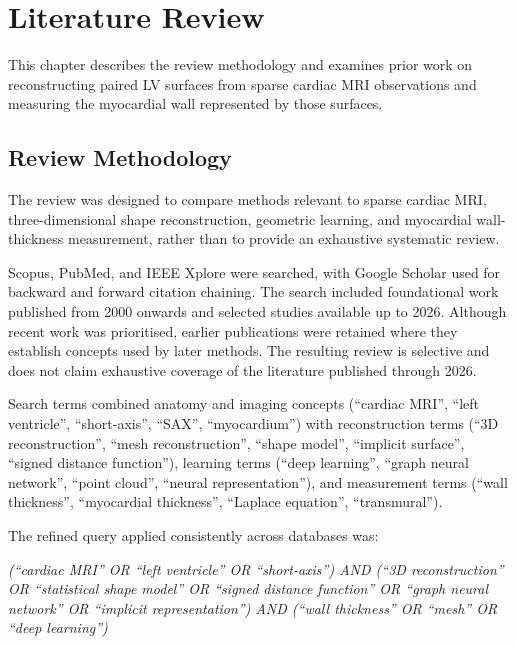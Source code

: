 ﻿%
\chapter{Literature Review}
\label{ch:literature-review}

\noindent
This chapter describes the review methodology and examines prior work on
reconstructing paired LV surfaces from sparse cardiac MRI observations and
measuring the myocardial wall represented by those surfaces.

\section{Review Methodology}
\label{sec:review-methodology}

\noindent
The review was designed to compare methods relevant to sparse cardiac MRI,
three-dimensional shape reconstruction, geometric learning, and myocardial
wall-thickness measurement, rather than to provide an exhaustive systematic
review.

Scopus, PubMed, and IEEE Xplore were searched, with Google Scholar used for
backward and forward citation chaining. The search included foundational work
published from 2000 onwards and selected studies available up to 2026. Although
recent work was prioritised, earlier publications were retained where they
establish concepts used by later methods. The resulting review is selective and
does not claim exhaustive coverage of the literature published through 2026.

Search terms combined anatomy and imaging concepts (``cardiac MRI'', ``left
ventricle'', ``short-axis'', ``SAX'', ``myocardium'') with reconstruction
terms (``3D reconstruction'', ``mesh reconstruction'', ``shape model'',
``implicit surface'', ``signed distance function''), learning terms (``deep
learning'', ``graph neural network'', ``point cloud'', ``neural
representation''), and measurement terms (``wall thickness'', ``myocardial
thickness'', ``Laplace equation'', ``transmural'').

The refined query applied consistently across databases was:

\noindent\textit{(``cardiac MRI'' OR ``left ventricle'' OR ``short-axis'') AND
(``3D reconstruction'' OR ``statistical shape model'' OR ``signed distance
function'' OR ``graph neural network'' OR ``implicit representation'') AND
(``wall thickness'' OR ``mesh'' OR ``deep learning'')}

